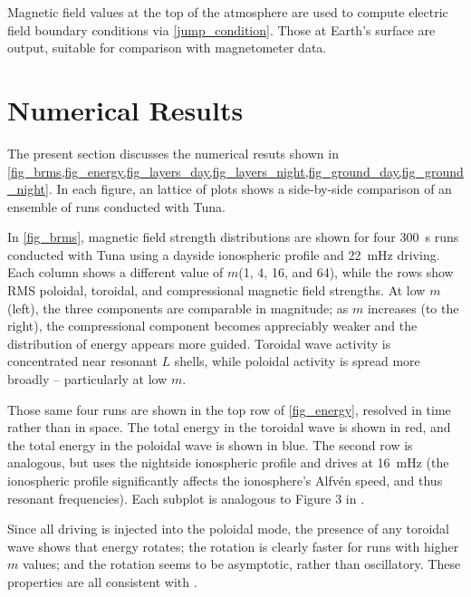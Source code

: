 \documentclass{article}
\newcommand{\Alfven}{Alfv\'en\xspace}
\newcommand{\azm}{\ensuremath{m}\xspace}
\begin{document}
Magnetic field values at the top of the atmosphere are used to compute electric field boundary conditions via \cref{jump_condition}. Those at Earth's surface are output, suitable for comparison with magnetometer data.


\section{Numerical Results}

The present section discusses the numerical resuts shown in \cref{fig_brms,fig_energy,fig_layers_day,fig_layers_night,fig_ground_day,fig_ground_night}. In each figure, an lattice of plots shows a side-by-side comparison of an ensemble of runs conducted with Tuna.

In \cref{fig_brms}, magnetic field strength distributions are shown for four \SI{300}{\second} runs conducted with Tuna using a dayside ionospheric profile and \SI{22}{\mHz} driving. Each column shows a different value of \azm (1, 4, 16, and 64), while the rows show RMS poloidal, toroidal, and compressional magnetic field strengths. At low \azm (left), the three components are comparable in magnitude; as \azm increases (to the right), the compressional component becomes appreciably weaker and the distribution of energy appears more guided. Toroidal wave activity is concentrated near resonant $L$ shells, while poloidal activity is spread more broadly -- particularly at low \azm.

Those same four runs are shown in the top row of \cref{fig_energy}, resolved in time rather than in space. The total energy in the toroidal wave is shown in red, and the total energy in the poloidal wave is shown in blue. The second row is analogous, but uses the nightside ionospheric profile and drives at \SI{16}{\mHz} (the ionospheric profile significantly affects the ionosphere's \Alfven speed, and thus resonant frequencies). Each subplot is analogous to Figure 3 in \cite{mann_1995}.

Since all driving is injected into the poloidal mode, the presence of any toroidal wave shows that energy rotates; the rotation is clearly faster for runs with higher \azm values; and the rotation seems to be asymptotic, rather than oscillatory. These properties are all consistent with \cite{mann_1995}.
\end{document}
